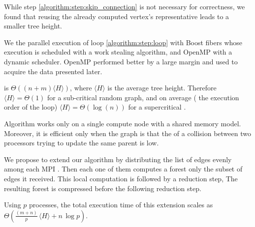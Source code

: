 While step \ref{algorithm:step:skip_connection} is not necessary for correctness, we found that
reusing the already computed vertex's representative leads to a smaller tree height. 

We  the parallel execution of loop \ref{algorithm:step:loop} with  Boost fibers
\cite{Boost}
whose execution is scheduled with a work stealing algorithm, and OpenMP with a dynamic scheduler.
OpenMP performed better by a large margin and  used to acquire the data presented later.

 is $\Theta((n + m)\langle H \rangle)$, where $\langle H \rangle$
is
the average tree height. Therefore $\langle H \rangle = \Theta(1)$ for a sub-critical random graph,
and on average ( the execution order of the loop) $\langle H \rangle = \Theta(\log(n))$
for a supercritical  \cite{RandomGraph}.

Algorithm \label{algorithm:cc2} works only on a single compute node with a shared memory model.
Moreover, it is efficient
only when the graph is  that the  of a collision between two processors
trying to update the same parent is low.

We propose to extend our algorithm by distributing the list of edges evenly among each MPI .
Then each one of them computes a forest  only the subset of edges it received. This local
computation
is followed by a reduction step,  
The resulting forest is  compressed  before the following reduction step.

Using $p$ processes, the total execution time of this extension scales as $\Theta(\frac{(m +
n)}{p}\, \langle H \rangle + n\,\log p)$.

